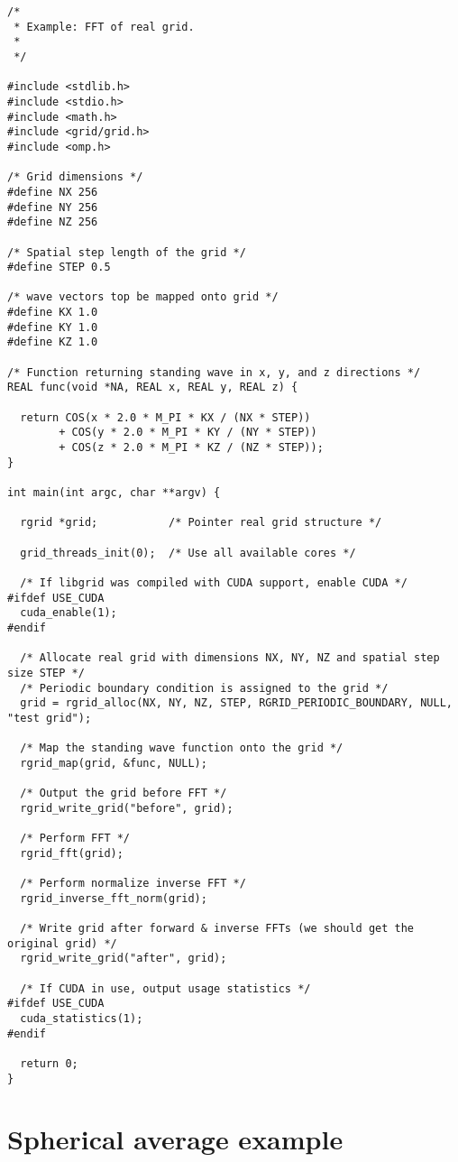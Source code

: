 \documentclass[12pt,letterpaper]{report}
\begin{document}
\begin{verbatim}
/*
 * Example: FFT of real grid.
 *
 */

#include <stdlib.h>
#include <stdio.h>
#include <math.h>
#include <grid/grid.h>
#include <omp.h>

/* Grid dimensions */
#define NX 256
#define NY 256
#define NZ 256

/* Spatial step length of the grid */
#define STEP 0.5

/* wave vectors top be mapped onto grid */
#define KX 1.0
#define KY 1.0
#define KZ 1.0

/* Function returning standing wave in x, y, and z directions */
REAL func(void *NA, REAL x, REAL y, REAL z) {

  return COS(x * 2.0 * M_PI * KX / (NX * STEP)) 
        + COS(y * 2.0 * M_PI * KY / (NY * STEP)) 
        + COS(z * 2.0 * M_PI * KZ / (NZ * STEP));
}

int main(int argc, char **argv) {

  rgrid *grid;           /* Pointer real grid structure */

  grid_threads_init(0);  /* Use all available cores */

  /* If libgrid was compiled with CUDA support, enable CUDA */
#ifdef USE_CUDA
  cuda_enable(1);
#endif

  /* Allocate real grid with dimensions NX, NY, NZ and spatial step size STEP */
  /* Periodic boundary condition is assigned to the grid */
  grid = rgrid_alloc(NX, NY, NZ, STEP, RGRID_PERIODIC_BOUNDARY, NULL, "test grid");

  /* Map the standing wave function onto the grid */
  rgrid_map(grid, &func, NULL);

  /* Output the grid before FFT */
  rgrid_write_grid("before", grid);

  /* Perform FFT */
  rgrid_fft(grid);

  /* Perform normalize inverse FFT */
  rgrid_inverse_fft_norm(grid);

  /* Write grid after forward & inverse FFTs (we should get the original grid) */
  rgrid_write_grid("after", grid);

  /* If CUDA in use, output usage statistics */
#ifdef USE_CUDA
  cuda_statistics(1);
#endif

  return 0;
}
\end{verbatim}

\section{Spherical average example}
\end{document}
